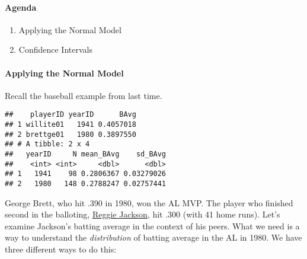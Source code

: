 \documentclass[10pt]{article}\usepackage[]{graphicx}\usepackage[]{color}
\makeatletter
\newenvironment{kframe}{%
 \def\at@end@of@kframe{}%
 \ifinner\ifhmode%
  \def\at@end@of@kframe{\end{minipage}}%
  \begin{minipage}{\columnwidth}%
 \fi\fi%
 \def\FrameCommand##1{\hskip\@totalleftmargin \hskip-\fboxsep
 \colorbox{shadecolor}{##1}\hskip-\fboxsep
     \hskip-\linewidth \hskip-\@totalleftmargin \hskip\columnwidth}%
 \MakeFramed {\advance\hsize-\width
   \@totalleftmargin\z@ \linewidth\hsize
   \@setminipage}}%
 {\par\unskip\endMakeFramed%
 \at@end@of@kframe}
\newenvironment{knitrout}{}{} %
\makeatother
\begin{document}
\paragraph{Agenda}
\begin{enumerate}
  \itemsep0em
  \item Applying the Normal Model
  \item Confidence Intervals
\end{enumerate}

\paragraph{Applying the Normal Model}

Recall the baseball example from last time. 

\begin{knitrout}\footnotesize
{}\color{fgcolor}\begin{kframe}


{\ttfamily\noindent\color{warningcolor}{\#\# Warning: package 'dplyr' was built under R version 3.3.2}}

{\ttfamily\noindent\color{warningcolor}{\#\# Warning: package 'bindrcpp' was built under R version 3.3.2}}\begin{verbatim}
##    playerID yearID      BAvg
## 1 willite01   1941 0.4057018
## 2 brettge01   1980 0.3897550
## # A tibble: 2 x 4
##   yearID     N mean_BAvg    sd_BAvg
##    <int> <int>     <dbl>      <dbl>
## 1   1941    98 0.2806367 0.03279026
## 2   1980   148 0.2788247 0.02757441
\end{verbatim}
\end{kframe}
\end{knitrout}

George Brett, who hit .390 in 1980, won the AL MVP. The player who finished second in the balloting, \href{https://www.google.com/search?q=reggie+jackson+baseball}{Reggie Jackson}, hit .300 (with 41 home runs). Let's examine Jackson's batting average in the context of his peers. What we need is a way to understand the \emph{distribution} of batting average in the AL in 1980. We have three different ways to do this:
\end{document}
